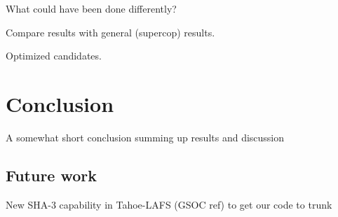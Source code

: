 \documentclass[english,12pt,a4paper]{book}
\begin{document}
What could have been done differently?

Compare results with general (supercop) results.

Optimized candidates.

\cite{s_nistround2}


\chapter{Conclusion}

A somewhat short conclusion summing up results and discussion

\section{Future work}

New SHA-3 capability in Tahoe-LAFS (GSOC ref) to get our code to trunk





\appendix
\appendixpage
\addappheadtotoc

\end{document}
